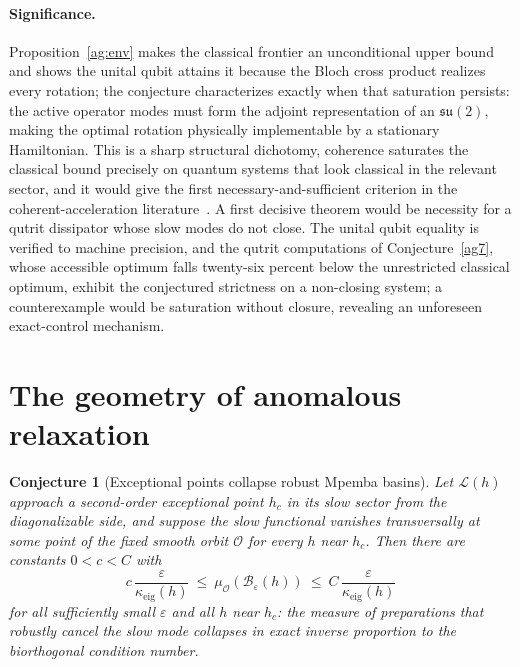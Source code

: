 \documentclass[11pt]{article}
\newtheorem{conjecture}{Conjecture}
\theoremstyle{definition}
\newcommand{\eps}{\varepsilon}
\begin{document}
\paragraph{Significance.}
Proposition~\ref{ag:env} makes the classical frontier an unconditional upper bound and shows the unital qubit attains it because the Bloch cross product realizes every rotation; the conjecture characterizes exactly when that saturation persists: the active operator modes must form the adjoint representation of an $\mathfrak{su}(2)$, making the optimal rotation physically implementable by a stationary Hamiltonian.  This is a sharp structural dichotomy, coherence saturates the classical bound precisely on quantum systems that look classical in the relevant sector, and it would give the first necessary-and-sufficient criterion in the coherent-acceleration literature~\cite{LiLu24,CRE26}.  A first decisive theorem would be necessity for a qutrit dissipator whose slow modes do not close.  The unital qubit equality is verified to machine precision, and the qutrit computations of Conjecture~\ref{ag7}, whose accessible optimum falls twenty-six percent below the unrestricted classical optimum, exhibit the conjectured strictness on a non-closing system; a counterexample would be saturation without closure, revealing an unforeseen exact-control mechanism.

\section{The geometry of anomalous relaxation}

\begin{conjecture}[Exceptional points collapse robust Mpemba basins]\label{ag9}
Let $\mathcal L(h)$ approach a second-order exceptional point $h_c$ in its slow sector from the diagonalizable side, and suppose the slow functional vanishes transversally at some point of the fixed smooth orbit $\mathcal O$ for every $h$ near $h_c$.  Then there are constants $0<c<C$ with
\[
c\,\frac{\eps}{\kappa_{\mathrm{eig}}(h)}\ \le\ \mu_\mathcal O(\mathcal B_\eps(h))\ \le\ C\,\frac{\eps}{\kappa_{\mathrm{eig}}(h)}
\]
for all sufficiently small $\eps$ and all $h$ near $h_c$: the measure of preparations that robustly cancel the slow mode collapses in exact inverse proportion to the biorthogonal condition number.
\end{conjecture}
\end{document}
